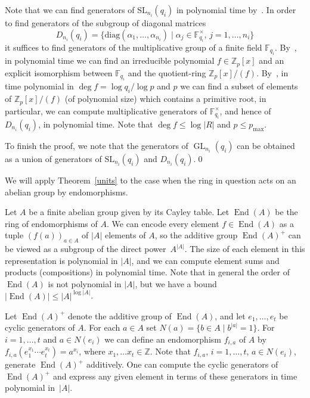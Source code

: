 \documentclass{article}
\DeclareMathOperator{\End}{End}
\DeclareMathOperator{\GL}{GL}
\begin{document}
Note that we can find generators of \( \mathrm{SL}_{n_i}(q_i) \) in polynomial time by~\cite[Section~3]{roncentr}.
In order to find generators of the subgroup of diagonal matrices
\[ D_{n_i}(q_i) = \{ \mathrm{diag}(\alpha_1, \dots, \alpha_{n_i}) \mid \alpha_j \in \mathbb{F}_{q_i}^\times,\, j = 1, \dots, n_i \} \]
it suffices to find generators of the multiplicative group of a finite field \( \mathbb{F}_{q_i} \).
By~\cite[Section~2]{lenstra}, in polynomial time we can find an irreducible polynomial \( f \in \mathbb{Z}_p[x] \)
and an explicit isomorphism between \( \mathbb{F}_{q_i} \) and the quotient-ring \( \mathbb{Z}_p[x] / (f) \).
By~\cite[Theorem~1.1]{shoup}, in time polynomial in \( \deg f = \log q_i / \log p \) and \( p \) we can find
a subset of elements of \( \mathbb{Z}_p[x] / (f) \) (of polynomial size) which contains a primitive root,
in particular, we can compute multiplicative generators of \( \mathbb{F}_{q_i}^\times \), and hence of \( D_{n_i}(q_i) \), in polynomial time.
Note that \( \deg f \leq \log |R| \) and \( p \leq p_{\max} \).

To finish the proof, we note that the generators of \( \GL_{n_i}(q_i) \) can be obtained as a union of generators of
\( \mathrm{SL}_{n_i}(q_i) \) and \( D_{n_i}(q_i) \).\qed
\medskip

We will apply Theorem~\ref{units} to the case when the ring in question acts on an abelian group by endomorphisms.

Let \( A \) be a finite abelian group given by its Cayley table. Let \( \End(A) \) be the ring of endomorphisms of \( A \).
We can encode every element \( f \in \End(A) \) as a tuple \( (f(a))_{a \in A} \) of \( |A| \) elements of \( A \),
so the additive group \( \End(A)^+ \) can be viewed as a subgroup of the direct power~\( A^{|A|} \).
The size of each element in this representation is polynomial in \( |A| \), and we can compute element sums and products (compositions) in polynomial time.
Note that in general the order of \( \End(A) \) is not polynomial in \( |A| \), but we have a bound \( |\End(A)| \leq |A|^{\log |A|} \).

Let \( \End(A)^+ \) denote the additive group of \( \End(A) \), and let \( e_1, \dots, e_t \) be cyclic generators of \( A \).
For each \( a \in A \) set \( N(a) = \{ b \in A \mid b^{|a|} = 1 \} \). For \( i = 1, \dots, t \) and \( a \in N(e_i) \)
we can define an endomorphism \( f_{i, a} \) of \( A \) by \( f_{i, a}(e_1^{x_1} \cdots e_t^{x_t}) = a^{x_i} \), 
where \( x_1, \dots x_t \in \mathbb{Z} \). Note that \( f_{i, a} \), \( i = 1, \dots, t \), \( a \in N(e_i) \), generate
\( \End(A)^+ \) additively.
One can compute the cyclic generators of \( \End(A)^+ \) and express any given element
in terms of these generators in time polynomial in~\( |A| \).
\end{document}
